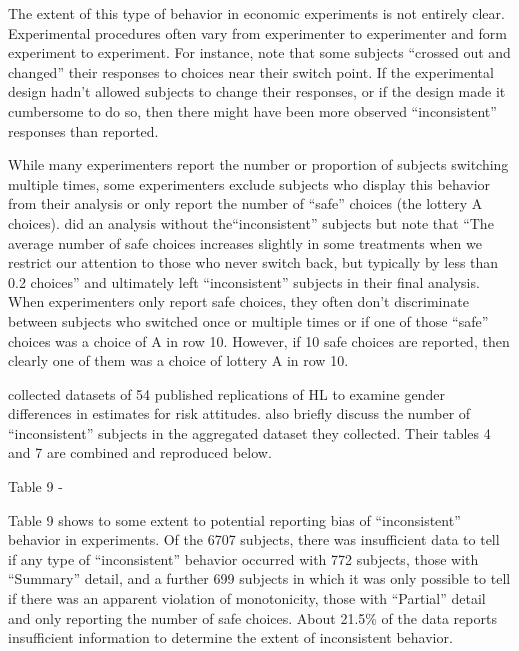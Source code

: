 \documentclass[../main.tex]{subfiles}
\begin{document}
The extent of this type of behavior in economic experiments is not entirely clear.
Experimental procedures often vary from experimenter to experimenter and form experiment to experiment.
For instance, \textcite{Holt2002} note that some subjects \enquote{crossed out and changed} their responses to choices near their switch point.
If the experimental design hadn't allowed subjects to change their responses, or if the design made it cumbersome to do so, then there might have been more observed \enquote{inconsistent} responses than reported. 

While many experimenters report the number or proportion of subjects switching multiple times, some experimenters exclude subjects who display this behavior from their analysis or only report the number of \enquote{safe} choices (the lottery A choices).
\textcite[1648]{Holt2002} did an analysis without the\enquote{inconsistent} subjects but note that \enquote{The average number of safe choices increases slightly in some treatments when we restrict our attention to those who never switch back, but typically by less than 0.2 choices} and ultimately left \enquote{inconsistent} subjects in their final analysis.
When experimenters only report safe choices, they often don't discriminate between subjects who switched once or multiple times or if one of those \enquote{safe} choices was a choice of A in row 10.
However, if 10 safe choices are reported, then clearly one of them was a choice of lottery A in row 10.

\textcite[9]{Filippin2014} collected datasets of 54 published replications of HL to examine gender differences in estimates for risk attitudes.
\textcite[10-11, 17-18]{Filippin2014} also briefly discuss the number of \enquote{inconsistent} subjects in the aggregated dataset they collected.
Their tables 4 and 7 are combined and reproduced below.

Table 9 - \textcite{Filippin2014}


Table 9 shows to some extent to potential reporting bias of \enquote{inconsistent} behavior in experiments.
Of the 6707 subjects, there was insufficient data to tell if any type of \enquote{inconsistent} behavior occurred with 772 subjects, those with \enquote{Summary} detail, and a further 699 subjects in which it was only possible to tell if there was an apparent violation of monotonicity, those with \enquote{Partial} detail and only reporting the number of safe choices.
About 21.5\% of the data reports insufficient information to determine the extent of inconsistent behavior.
\end{document}
